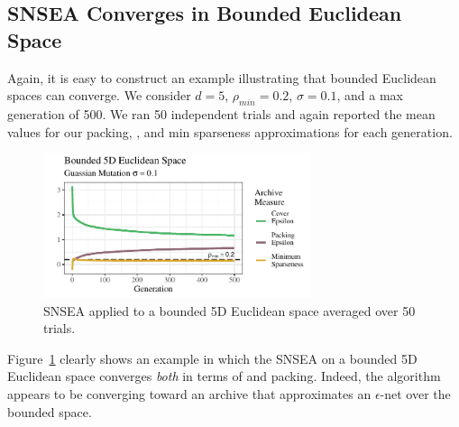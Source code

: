 \documentclass[twoside]{article}
\begin{document}
\subsection{SNSEA Converges in Bounded Euclidean Space}
\label{subsec:bounded}
Again, it is easy to construct an example illustrating that bounded Euclidean spaces can converge.  We consider $d=5$, $\rho_{min} = 0.2$, $\sigma=0.1$, and a max generation of 500.  We ran 50 independent trials and again reported the mean values for our packing, , and min sparseness approximations for each generation.  
\begin{figure}[h]
  \center\includegraphics[width=0.7\textwidth]{Figures/bounded-s01-r02-NOPOP.pdf}
  \caption{\label{fig:bounded:nopop:0103} SNSEA applied to a bounded 5D Euclidean space averaged over 50 trials.}
\end{figure}

Figure~\ref{fig:bounded:nopop:0103} clearly shows an example in which the SNSEA on a bounded 5D Euclidean space converges \emph{both} in terms of  and packing.  Indeed, the algorithm appears to be converging toward an archive that approximates an $\epsilon$-net over the bounded space.  
\end{document}
